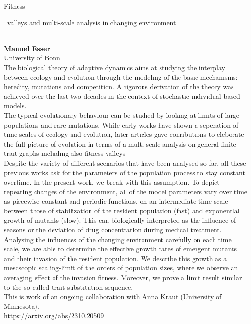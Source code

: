 \documentclass[12pt,a4paper]{article}
\newcommand{\ZAbst}{\rule[-1ex]{0pt}{2ex}\ } %
\begin{document}
\noindent
{\Large Fitness\ZAbst valleys and multi-scale analysis in changing environment}\\[1ex]
{\large 
\textbf{Manuel Esser}\\[1ex]
University of Bonn}\\[2ex]
The biological theory of adaptive dynamics aims at studying the interplay between ecology and evolution through the modeling of the basic mechanisms: heredity, mutations and competition. A rigorous derivation of the theory was achieved over the last two decades in the context of stochastic individual-based models.
\\
The typical evolutionary behaviour can be studied by looking at limits of large populations and rare mutations. While early works have shown a seperation of time scales of ecology and evolution, later articles gave conributions to eleborate the full picture of evolution in terms of a multi-scale analysis on general finite trait graphs including also fitness valleys.
\\
Despite the variety of different scenarios that have been analysed so far, all these previous works ask for the parameters of the population process to stay constant overtime. In the present work, we break with this assumption. To depict repeating changes of the environment, all of the model parameters vary over time as piecewise constant and periodic functions, on an intermediate time scale between those of stabilization of the resident population (fast) and exponential growth of mutants (slow). This can biologically interpreted as the influence of seasons or the deviation of drug concentration during medical treatment.
\\
Analysing the influences of the changing environment carefully on each time scale, we are able to determine the effective growth rates of emergent mutants and their invasion of the resident population. We describe this growth as a mesoscopic scaling-limit of the orders of population sizes, where we observe an averaging effect of the invasion fitness. Moreover, we prove a limit result similar to the so-called trait-substitution-sequence.
\\
This is work of an ongoing collaboration with Anna Kraut (University of Minnesota). 
\\
\url{https://arxiv.org/abs/2310.20509}


\newpage
\end{document}
